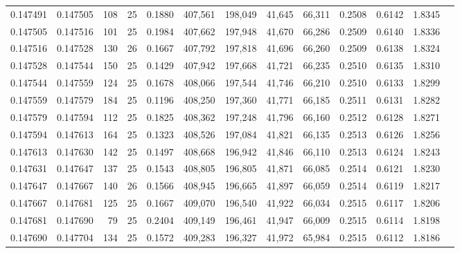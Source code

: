 \begin{tabular}{rrrrrrrrrrrrr}
0.147491 & 0.147505 &   108 &  25 &                                     0.1880 & 407,561 & 198,049 &  41,645 &  66,311 & 0.2508 & 0.6142 & 1.8345 \\
0.147505 & 0.147516 &   101 &  25 &                                     0.1984 & 407,662 & 197,948 &  41,670 &  66,286 & 0.2509 & 0.6140 & 1.8336 \\
0.147516 & 0.147528 &   130 &  26 &                                     0.1667 & 407,792 & 197,818 &  41,696 &  66,260 & 0.2509 & 0.6138 & 1.8324 \\
0.147528 & 0.147544 &   150 &  25 &                                     0.1429 & 407,942 & 197,668 &  41,721 &  66,235 & 0.2510 & 0.6135 & 1.8310 \\
0.147544 & 0.147559 &   124 &  25 &                                     0.1678 & 408,066 & 197,544 &  41,746 &  66,210 & 0.2510 & 0.6133 & 1.8299 \\
0.147559 & 0.147579 &   184 &  25 &                                     0.1196 & 408,250 & 197,360 &  41,771 &  66,185 & 0.2511 & 0.6131 & 1.8282 \\
0.147579 & 0.147594 &   112 &  25 &                                     0.1825 & 408,362 & 197,248 &  41,796 &  66,160 & 0.2512 & 0.6128 & 1.8271 \\
0.147594 & 0.147613 &   164 &  25 &                                     0.1323 & 408,526 & 197,084 &  41,821 &  66,135 & 0.2513 & 0.6126 & 1.8256 \\
0.147613 & 0.147630 &   142 &  25 &                                     0.1497 & 408,668 & 196,942 &  41,846 &  66,110 & 0.2513 & 0.6124 & 1.8243 \\
0.147631 & 0.147647 &   137 &  25 &                                     0.1543 & 408,805 & 196,805 &  41,871 &  66,085 & 0.2514 & 0.6121 & 1.8230 \\
0.147647 & 0.147667 &   140 &  26 &                                     0.1566 & 408,945 & 196,665 &  41,897 &  66,059 & 0.2514 & 0.6119 & 1.8217 \\
0.147667 & 0.147681 &   125 &  25 &                                     0.1667 & 409,070 & 196,540 &  41,922 &  66,034 & 0.2515 & 0.6117 & 1.8206 \\
0.147681 & 0.147690 &    79 &  25 &                                     0.2404 & 409,149 & 196,461 &  41,947 &  66,009 & 0.2515 & 0.6114 & 1.8198 \\
0.147690 & 0.147704 &   134 &  25 &                                     0.1572 & 409,283 & 196,327 &  41,972 &  65,984 & 0.2515 & 0.6112 & 1.8186 \\

\end{tabular}
